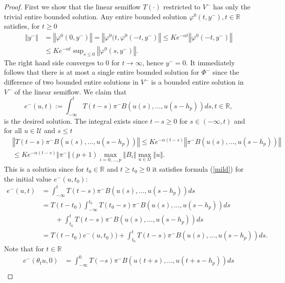 \documentclass{siamltex}%
\begin{document}
\begin{proof}
First we show that the linear semiflow $T(\cdot)$ restricted to $V^{-}$ has
only the trivial entire bounded solution. Any entire bounded solution
$\varphi^{0}(t,y^{-}),t\in\mathbb{R}$ satisfies, for $t\geq0$%
\begin{align*}
\left\Vert y^{-}\right\Vert  &  =\left\Vert \varphi^{0}(0,y^{-})\right\Vert
=\left\Vert \varphi^{0}(t,\varphi^{0}(-t,y^{-})\right\Vert \leq Ke^{-\alpha
t}\left\Vert \varphi^{0}(-t,y^{-})\right\Vert \\
&  \leq Ke^{-\alpha t}\sup\nolimits_{s\leq0}\left\Vert \varphi^{0}%
(s,y^{-})\right\Vert .
\end{align*}
The right hand side converges to $0$ for $t\rightarrow\infty$, hence $y^{-}%
=0$. It immediately follows that there is at most a single entire bounded
solution for $\Phi^{-}$ since the difference of two bounded entire solutions
in $V^{-}$ is a bounded entire solution in $V^{-}$ of the linear semiflow. We
claim that%
\[
e^{-}(u,t):=\int_{-\infty}^{t}T(t-s)\pi^{-}B(u(s),\ldots,u(s-h_{p}%
))ds,t\in\mathbb{R},
\]
is the desired solution. The integral exists since $t-s\geq0$ for
$s\in(-\infty,t)$ and for all $u\in\mathcal{U}$ and $s\leq t$%
\begin{align*}
&  \left\Vert T(t-s)\pi^{-}B(u(s),\ldots,u(s-h_{p}))\right\Vert \leq
Ke^{-\alpha(t-s)}\left\Vert \pi^{-}B(u(s),\ldots,u(s-h_{p}))\right\Vert \\
&  \leq Ke^{-\alpha(t-s)}\left\Vert \pi^{-}\right\Vert (p+1)\max
_{i=0,\ldots,p}\left\Vert B_{i}\right\Vert \max_{u\in\Omega}\left\Vert
u\right\Vert .
\end{align*}
This is a solution since for $t_{0}\in\mathbb{R}$ and $t\geq t_{0}\geq0$ it
satisfies formula (\ref{mild}) for the initial value $e^{-}(u,t_{0})$:%
\begin{align*}
e^{-}(u,t)  &  =\int_{-\infty}^{t}T(t-s)\pi^{-}B(u(s),\ldots,u(s-h_{p}))ds\\
&  =T(t-t_{0})\int_{-\infty}^{t_{0}}T(t_{0}-s)\pi^{-}B(u(s),\ldots
,u(s-h_{p}))ds\\
&  \qquad+\int_{t_{0}}^{t}T(t-s)\pi^{-}B(u(s),\ldots,u(s-h_{p}))ds\\
&  =T(t-t_{0})e^{-}(u,t_{0}))+\int_{t_{0}}^{t}T(t-s)\pi^{-}B(u(s),\ldots
,u(s-h_{p}))ds.
\end{align*}
Note that for $t\in\mathbb{R}$%
\begin{align*}
e^{-}(\theta_{t}u,0)  &  =\int_{-\infty}^{0}T(-s)\pi^{-}B(u(t+s),\ldots
,u(t+s-h_{p}))ds\\

\end{align*}
\end{proof}
\end{document}
